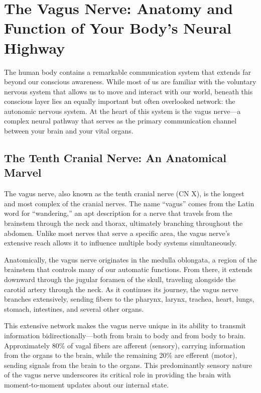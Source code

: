 \documentclass[
  Letterpaper,
]{scrbook}
\begin{document}
\chapter{The Vagus Nerve: Anatomy and Function of Your Body's Neural
Highway}\label{the-vagus-nerve-anatomy-and-function-of-your-bodys-neural-highway}

The human body contains a remarkable communication system that extends
far beyond our conscious awareness. While most of us are familiar with
the voluntary nervous system that allows us to move and interact with
our world, beneath this conscious layer lies an equally important but
often overlooked network: the autonomic nervous system. At the heart of
this system is the vagus nerve---a complex neural pathway that serves as
the primary communication channel between your brain and your vital
organs.

\section{The Tenth Cranial Nerve: An Anatomical
Marvel}\label{the-tenth-cranial-nerve-an-anatomical-marvel}

The vagus nerve, also known as the tenth cranial nerve (CN X), is the
longest and most complex of the cranial nerves. The name ``vagus'' comes
from the Latin word for ``wandering,'' an apt description for a nerve
that travels from the brainstem through the neck and thorax, ultimately
branching throughout the abdomen. Unlike most nerves that serve a
specific area, the vagus nerve's extensive reach allows it to influence
multiple body systems simultaneously.

Anatomically, the vagus nerve originates in the medulla oblongata, a
region of the brainstem that controls many of our automatic functions.
From there, it extends downward through the jugular foramen of the
skull, traveling alongside the carotid artery through the neck. As it
continues its journey, the vagus nerve branches extensively, sending
fibers to the pharynx, larynx, trachea, heart, lungs, stomach,
intestines, and several other organs.

This extensive network makes the vagus nerve unique in its ability to
transmit information bidirectionally---both from brain to body and from
body to brain. Approximately 80\% of vagal fibers are afferent
(sensory), carrying information from the organs to the brain, while the
remaining 20\% are efferent (motor), sending signals from the brain to
the organs. This predominantly sensory nature of the vagus nerve
underscores its critical role in providing the brain with
moment-to-moment updates about our internal state.
\end{document}
